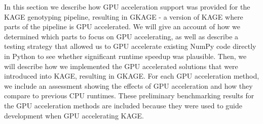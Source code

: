In this section we describe how GPU acceleration support was provided for the KAGE genotyping pipeline, resulting in GKAGE - a version of KAGE where parts of the pipeline is GPU accelerated.
We will give an account of how we determined which parts to focus on GPU accelerating, as well as describe a testing strategy that allowed us to GPU accelerate existing NumPy code directly in Python to see whether significant runtime speedup was plausible.
Then, we will describe how we implemented the GPU accelerated solutions that were introduced into KAGE, resulting in GKAGE.
For each GPU acceleration method, we include an assessment showing the effects of GPU acceleration and how they compare to previous CPU runtimes.
These preliminary benchmarking results for the GPU acceleration methods are included because they were used to guide development when GPU accelerating KAGE.
